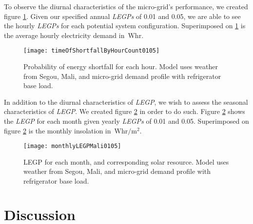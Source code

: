\documentclass{article}
\newcommand{\unit}[1]{\ensuremath{\, \mathrm{#1}}}
\begin{document}
To observe the diurnal characteristics of the micro-grid's performance, we created figure \ref{hourlyLEGP}.
Given our specified annual \emph{LEGPs} of 0.01 and 0.05, we are able to see the hourly \emph{LEGPs} for each potential system configuration.
Superimposed on \ref{hourlyLEGP} is the average hourly electricity demand in \unit{Whr}.

\begin{figure}[ht]
\centering
\texttt{[image: timeOfShortfallByHourCount0105]}
\caption{Probability of energy shortfall for each hour. Model uses weather from Segou, Mali, and micro-grid demand profile with refrigerator base load.}
\label{hourlyLEGP}
\end{figure} 

In addition to the diurnal characteristics of \emph{LEGP}, we wish to assess the seasonal characteristics of \emph{LEGP}. 
We created figure \ref{monthlyLEGP} in order to do such.
Figure \ref{monthlyLEGP} shows the \emph{LEGP} for each month given yearly \emph{LEGPs} of 0.01 and 0.05.
Superimposed on figure \ref{monthlyLEGP} is the monthly insolation in \unit{Whr/m^2}.


\begin{figure}[ht]
\centering
\texttt{[image: monthlyLEGPMali0105]}
\caption{LEGP for each month, and corresponding solar resource. Model uses weather from Segou, Mali, and micro-grid demand profile with refrigerator base load.}
\label{monthlyLEGP}
\end{figure} 





\section{Discussion}
\end{document}

